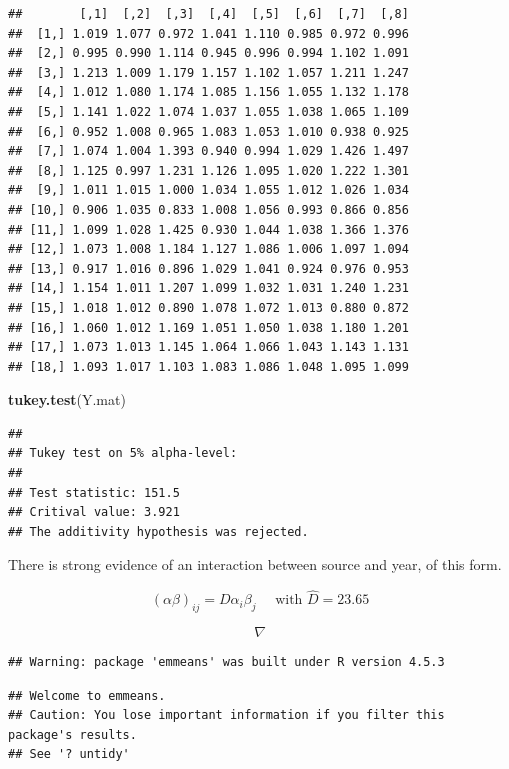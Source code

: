 \documentclass[
]{book}
\newenvironment{Shaded}{\begin{snugshade}}{\end{snugshade}}
\newcommand{\FunctionTok}[1]{\textcolor[rgb]{0.13,0.29,0.53}{\textbf{#1}}}
\newcommand{\NormalTok}[1]{#1}
\begin{document}
\begin{verbatim}
##        [,1]  [,2]  [,3]  [,4]  [,5]  [,6]  [,7]  [,8]
##  [1,] 1.019 1.077 0.972 1.041 1.110 0.985 0.972 0.996
##  [2,] 0.995 0.990 1.114 0.945 0.996 0.994 1.102 1.091
##  [3,] 1.213 1.009 1.179 1.157 1.102 1.057 1.211 1.247
##  [4,] 1.012 1.080 1.174 1.085 1.156 1.055 1.132 1.178
##  [5,] 1.141 1.022 1.074 1.037 1.055 1.038 1.065 1.109
##  [6,] 0.952 1.008 0.965 1.083 1.053 1.010 0.938 0.925
##  [7,] 1.074 1.004 1.393 0.940 0.994 1.029 1.426 1.497
##  [8,] 1.125 0.997 1.231 1.126 1.095 1.020 1.222 1.301
##  [9,] 1.011 1.015 1.000 1.034 1.055 1.012 1.026 1.034
## [10,] 0.906 1.035 0.833 1.008 1.056 0.993 0.866 0.856
## [11,] 1.099 1.028 1.425 0.930 1.044 1.038 1.366 1.376
## [12,] 1.073 1.008 1.184 1.127 1.086 1.006 1.097 1.094
## [13,] 0.917 1.016 0.896 1.029 1.041 0.924 0.976 0.953
## [14,] 1.154 1.011 1.207 1.099 1.032 1.031 1.240 1.231
## [15,] 1.018 1.012 0.890 1.078 1.072 1.013 0.880 0.872
## [16,] 1.060 1.012 1.169 1.051 1.050 1.038 1.180 1.201
## [17,] 1.073 1.013 1.145 1.064 1.066 1.043 1.143 1.131
## [18,] 1.093 1.017 1.103 1.083 1.086 1.048 1.095 1.099
\end{verbatim}

\begin{Shaded}
\begin{Highlighting}[]
\FunctionTok{tukey.test}\NormalTok{(Y.mat)}
\end{Highlighting}
\end{Shaded}

\begin{verbatim}
## 
## Tukey test on 5% alpha-level:
## 
## Test statistic: 151.5 
## Critival value: 3.921 
## The additivity hypothesis was rejected.
\end{verbatim}

There is strong evidence of an interaction between source and year, of
this form.

\[
(\alpha\beta)_{ij} = D\alpha_i\beta_j \quad \mbox{ with } \hat{D}=23.65
\]

\[ \nabla  \]

\begin{verbatim}
## Warning: package 'emmeans' was built under R version 4.5.3
\end{verbatim}

\begin{verbatim}
## Welcome to emmeans.
## Caution: You lose important information if you filter this package's results.
## See '? untidy'
\end{verbatim}
\end{document}
